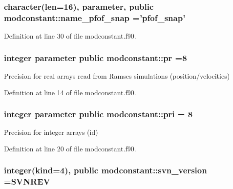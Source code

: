 \hypertarget{classmodconstant_af7a0e90a75b8e13c6e6bcf434bafcd84}{
\subsubsection[{name\-\_\-pfof\-\_\-snap}]{\setlength{\rightskip}{0pt plus 5cm}character(len=16), parameter, public modconstant\-::name\-\_\-pfof\-\_\-snap ='pfof\-\_\-snap'}}\label{classmodconstant_af7a0e90a75b8e13c6e6bcf434bafcd84}


Definition at line 30 of file modconstant.\-f90.

\hypertarget{classmodconstant_ae56d6723f2d9f742f5e86130f933dc5a}{
\subsubsection[{pr}]{\setlength{\rightskip}{0pt plus 5cm}integer parameter public modconstant\-::pr =8}}\label{classmodconstant_ae56d6723f2d9f742f5e86130f933dc5a}


Precision for real arrays read from Ramses simulations (position/velocities) 



Definition at line 14 of file modconstant.\-f90.

\hypertarget{classmodconstant_a7a71c60a74ed2c5f33f51df2c6709c41}{
\subsubsection[{pri}]{\setlength{\rightskip}{0pt plus 5cm}integer parameter public modconstant\-::pri = 8}}\label{classmodconstant_a7a71c60a74ed2c5f33f51df2c6709c41}


Precision for integer arrays (id) 



Definition at line 20 of file modconstant.\-f90.

\hypertarget{classmodconstant_aa77df404168800abb297de67a837cb04}{
\subsubsection[{svn\-\_\-version}]{\setlength{\rightskip}{0pt plus 5cm}integer(kind=4), public modconstant\-::svn\-\_\-version =S\-V\-N\-R\-E\-V}}\label{classmodconstant_aa77df404168800abb297de67a837cb04}


